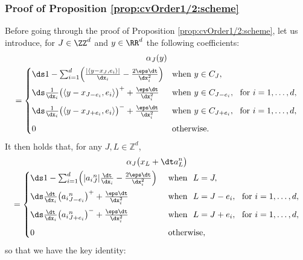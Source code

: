 \subsubsection{Proof of Proposition \ref{prop:cvOrder1/2:scheme}}

Before going through the proof of Proposition \ref{prop:cvOrder1/2:scheme}, let us introduce, for $J\in\ZZ^d$ and $y \in \RR^d$ the following coefficients:
\begin{multline}\label{def:alpha}
\alpha_J(y)\\
=
\begin{cases}
\ds 1-\sum_{i=1}^d \Bigl(\frac{|\langle y-{x_J},e_i\rangle|}{\dx_i} - \frac{2\eps\dt}{\dx_i^2}\Bigr)
& \textup{when} \ y\in C_J,
\vspace{5pt}
\\
\ds \frac{1}{\dx_i}\bigl(\langle y-x_{J-e_i},e_i\rangle\bigr)^+ + \frac{\eps\dt}{\dx_i^2}
&\textup{when} \ y\in C_{J-e_i}, \ \ \textup{for} \ i= 1,\dots,d,
\vspace{5pt}
\\
\ds \frac{1}{\dx_i}\bigl(\langle y-x_{J+e_i},e_i\rangle\bigr)^- + \frac{\eps\dt}{\dx_i^2}
&\textup{when} \ y\in C_{J+e_i}, \ \ \textup{for} \ i=1,\dots,d,
\vspace{5pt}
\\
0 &\textup{otherwise}.
\end{cases}
\end{multline}
It then holds that, for any $J,L \in {\mathbb Z}^d$,
\begin{multline*}%
\alpha_{J} \bigl( x_{L} + \dt a^n_{L}\bigr)\\ =
\begin{cases}
\ds 1-\sum_{i=1}^d \Bigl(\vert {a_{i}}^n_{J} \vert \frac{\dt}{\dx_i} - \frac{2\eps\dt}{\dx_i^2}\Bigr)
&\textup{ when } \ L=J,
\vspace{5pt}
\\
\ds \frac{\dt}{\dx_i}\bigl( {a_{i}}^n_{J-e_{i}} \bigr)^{+} + \frac{\eps\dt}{\dx_i^2}
&\textup{ when } \ L = J-e_{i}, \ \ \textup{for} \ i= 1,\dots,d,
\vspace{5pt}
\\
\ds \frac{\dt}{\dx_i}\bigl( {a_{i}}^n_{J+e_{i}} \bigr)^{-} + \frac{\eps\dt}{\dx_i^2}
&\textup{ when } \ L = J+e_{i}, \ \ \textup{for} \ i= 1,\dots,d,
\vspace{5pt}
\\
0 & \textup{ otherwise},
\end{cases}
\end{multline*}
so that we have the key identity:
